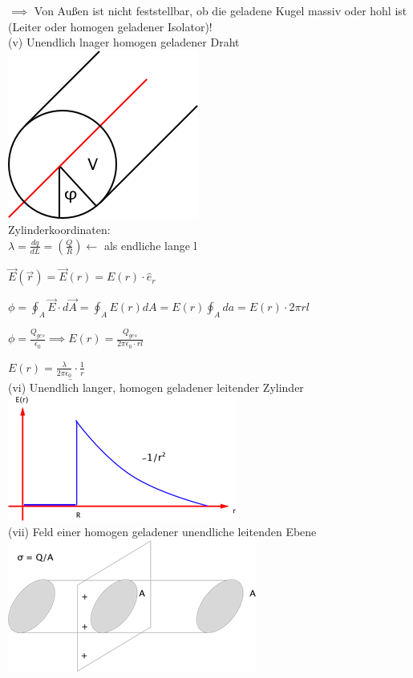 \documentclass[11pt]{article}
\begin{document}
$\implies$ Von Außen ist nicht feststellbar, ob die geladene Kugel massiv oder hohl ist (Leiter oder homogen geladener Isolator)!\\

(v) Unendlich lnager homogen geladener Draht\\

\includegraphics{skizzen/14/14_6B8}\\

Zylinderkoordinaten:\\

$ \lambda=\frac{dq}{dL}=(\frac{Q}{R})\leftarrow $ als endliche lange l

$ \vec{E}(\vec{r})=\vec{E}(r)=E(r)\cdot\hat{e}_r $

$ \phi=\oint_{A}\vec{E}\cdot d\vec{A}=\oint_{A}E(r)dA=E(r)\oint_{A}da= E(r)\cdot 2\pi r l $

$ \phi=\frac{Q_{ges}}{\epsilon_0}\implies E(r)= \frac{Q_{ges}}{2\pi\epsilon_0\cdot rl} $

$ E(r)= \underline{ \frac{\lambda}{2\pi\epsilon_0}\cdot\frac{1}{r}}$\\

(vi) Unendlich langer, homogen geladener leitender Zylinder\\

\includegraphics{skizzen/14/14_6B9}\\

(vii) Feld einer homogen geladener unendliche leitenden Ebene\\

\includegraphics{skizzen/14/14_6BA}
\end{document}
